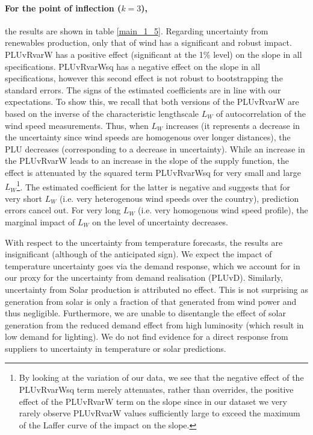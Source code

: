 \paragraph{For the point of inflection ($k=3$),}
the results are shown in table \ref{main_1_5}. %
Regarding uncertainty from renewables production, only that of wind has a significant and robust impact. PLUvRvarW has a positive effect (significant at the 1\% level) on the slope in all specifications. PLUvRvarWsq has a negative effect on the slope in all specifications, however this second effect is not robust to bootstrapping the standard errors. The signs of the estimated coefficients are in line with our expectations. To show this, we recall that both versions of the PLUvRvarW are %
based on the inverse of the characteristic lengthscale $L_W$ of autocorrelation of the wind speed measurements. Thus,  when $L_W$ increases (it represents a decrease in the uncertainty since wind speeds are homogenous over longer distances), the PLU decreases (corresponding to a decrease in uncertainty). 
While an increase in the PLUvRvarW leads to an increase in the slope of the supply function, the effect is attenuated by the squared term PLUvRvarWsq 
for very small and large $L_W$\footnote{By looking at the variation of our data, we see that the negative effect of the PLUvRvarWsq term merely attenuates, rather than overrides, the positive effect of the PLUvRvarW term on the slope since in our dataset we very rarely observe PLUvRvarW values sufficiently large to exceed the maximum of the Laffer curve of the impact on the slope.}. The estimated coefficient for the latter is negative and suggests that for very short $L_W$ (i.e. very heterogenous wind speeds over the country), prediction errors cancel out. For very long $L_W$ (i.e. very homogenous wind speed profile), the marginal impact of $L_W$ on the level of uncertainty decreases. 


With respect to the uncertainty from temperature forecasts, the results are insignificant (although of the anticipated sign). We expect the impact of temperature uncertainty goes via the demand response, which we account for in our proxy for the uncertainty from demand realisation (PLUvD). Similarly, uncertainty from Solar production is attributed no effect. This is not surprising as 
generation from solar is only a fraction of that generated from wind power and thus negligible.
Furthermore, we are unable to disentangle the effect of solar generation from the reduced demand effect from high luminosity (which result in low demand for lighting). We do not find evidence for a direct response from suppliers to uncertainty in temperature or solar predictions. 

